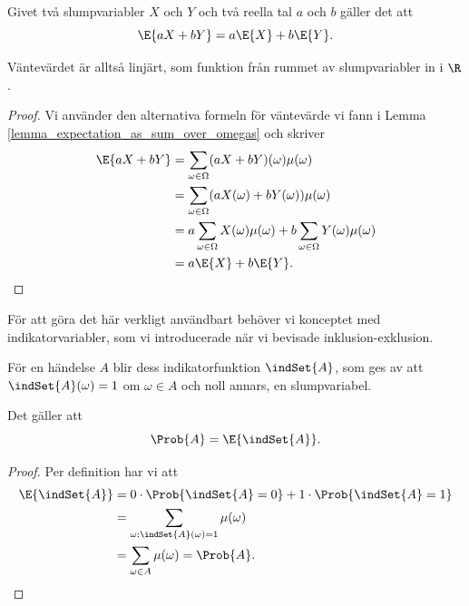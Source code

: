 \documentclass[nobib]{tufte-handout}
\begin{document}
\begin{lemma}
    Givet två slumpvariabler $X$ och $Y$ och två reella tal $a$ och $b$ gäller det att
    $$\E{aX + bY} = a\E{X} + b\E{Y}.$$

    Väntevärdet är alltså linjärt, som funktion från rummet av slumpvariabler in i $\R$.

    \begin{proof}
        Vi använder den alternativa formeln för väntevärde vi fann i Lemma \ref{lemma_expectation_as_sum_over_omegas} och skriver
        \begin{align*}
            \E{aX + bY} &= \sum_{\omega \in \Omega} (aX + bY)(\omega)\mu(\omega)\\
            &= \sum_{\omega \in \Omega} (aX(\omega) + bY(\omega))\mu(\omega)\\
            &= a\sum_{\omega \in \Omega} X(\omega)\mu(\omega) + b\sum_{\omega \in \Omega} Y(\omega)\mu(\omega)\\
            &= a\E{X} + b\E{Y}.
        \end{align*}
    \end{proof}
\end{lemma}

För att göra det här verkligt användbart behöver vi konceptet med indikatorvariabler, som vi introducerade när vi bevisade inklusion-exklusion.

\begin{proposition}
    För en händelse $A$ blir dess indikatorfunktion $\indSet{A}$, som ges av att $\indSet{A}(\omega) = 1$ om $\omega \in A$ och noll annars, en slumpvariabel.

    Det gäller att
    $$\Prob{A} = \E{\indSet{A}}.$$

    \begin{proof}
        Per definition har vi att
        \begin{align*}
            \E{\indSet{A}} &= 0\cdot\Prob{\indSet{A} = 0} + 1\cdot\Prob{\indSet{A} = 1}\\
            &= \sum_{\omega: \indSet{A}(\omega) = 1} \mu(\omega)\\
            &= \sum_{\omega \in A} \mu(\omega) = \Prob{A}.
        \end{align*}
    \end{proof}
\end{proposition}
\end{document}
